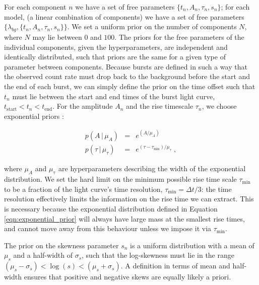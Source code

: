 \documentclass[12pt]{emulateapj}
\newcommand{\given}{\,|\,}
\newcommand{\mean}{\lambda}
\begin{document}
For each component $n$ we have a set of free parameters $\{t_n, A_n, \tau_n, s_n \}$; for each model, (a 
linear combination of components) we have a set of free parameters $\{\mean_{bg}, \{t_n, A_n, \tau_n, s_n\} \}$.
We set a uniform prior on the number of components $N$, where $N$ may lie between $0$ and $100$. 
The priors for the free parameters of the individual components, given the hyperparameters, are independent and identically distributed, such that priors 
are the same for a given type of parameter between components. 
Because bursts are defined in such a way that the observed count rate must drop back to the background before the
start and the end of each burst, we can simply define the prior on the time offset such that $t_n$ must lie between
the start and end times of the burst light curve, $t_{\mathrm{start}} < t_n < t_\mathrm{end}$. 
For the amplitude $A_n$ and the rise timescale $\tau_n$, we choose exponential priors \citep{skilling1998}:


\begin{eqnarray}
p(A \given \mu_A) &=& e^{(A/\mu_A)} \\
p(\tau \given \mu_{\tau}) & = & e^{(\tau - \tau_{\mathrm{min}})/\mu_{\tau}} \; ,
\label{eqn:exponential_prior}
\end{eqnarray}

where $\mu_A$ and $\mu_{\mathrm{\tau}}$ are hyperparameters describing the width of the exponential distribution.
We set the hard limit on the minimum possible rise time scale $\tau_{\mathrm{min}}$ to be a fraction of the light curve's time resolution,
$\tau_{\mathrm{min}} = \Delta t/3$: the time resolution effectively limits the information on the rise time we can extract. This is necessary because
the exponential distribution defined in Equation \ref{eqn:exponential_prior} will always have large mass at the smallest rise times, and cannot move away
from this behaviour unless we impose it via $\tau_{\mathrm{min}}$.

The prior on the skewness parameter $s_n$ is a uniform distribution with a mean of $\mu_s$ and a half-width of $\sigma_s$, such
that the log-skewness must lie in the range $(\mu_s-\sigma_s) < \log{(s)} < (\mu_s+\sigma_s)$. A definition in terms of mean and half-width ensures
that positive and negative skews are equally likely a priori. 

\end{document}
